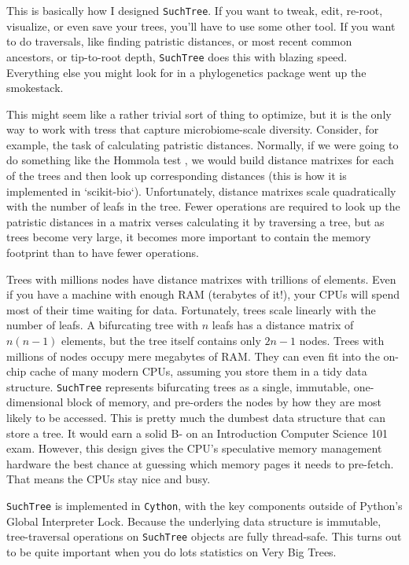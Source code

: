 \documentclass[
10pt, %
a4paper, %
oneside, %
headinclude,footinclude, %
BCOR5mm, %
]{scrartcl}
\begin{document}
This is basically how I designed {\tt SuchTree}. If you want to tweak, edit, re-root, visualize, or even save your trees, you'll have to use some other tool. If you want to do traversals, like finding patristic distances, or most recent common ancestors, or tip-to-root depth, {\tt SuchTree} does this with blazing speed. Everything else you might look for in a phylogenetics package went up the smokestack.

This might seem like a rather trivial sort of thing to optimize, but it is the only way to work with tress that capture microbiome-scale diversity. Consider, for example, the task of calculating patristic distances. Normally, if we were going to do something like the Hommola test \cite{hommola2009permutation,}, we would build distance matrixes for each of the trees and then look up corresponding distances (this is how it is implemented in `scikit-bio`). Unfortunately, distance matrixes scale quadratically with the number of leafs in the tree. Fewer operations are required to look up the patristic distances in a matrix verses calculating it by traversing a tree, but as trees become very large, it becomes more important to contain the memory footprint than to have fewer operations.

Trees with millions nodes have distance matrixes with trillions of elements. Even if you have a machine with enough RAM (terabytes of it!), your CPUs will spend most of their time waiting for data. Fortunately, trees scale linearly with the number of leafs. A bifurcating tree with $n$ leafs has a distance matrix of $n(n-1)$ elements, but the tree itself contains only $2n-1$ nodes. Trees with millions of nodes occupy mere megabytes of RAM. They can even fit into the on-chip cache of many modern CPUs, assuming you store them in a tidy data structure. {\tt SuchTree} represents bifurcating trees as a single, immutable, one-dimensional block of memory, and pre-orders the nodes by how they are most likely to be accessed. This is pretty much the dumbest data structure that can store a tree. It would earn a solid B- on an Introduction Computer Science 101 exam. However, this design gives the CPU's speculative memory management hardware the best chance at guessing which memory pages it needs to pre-fetch. That means the CPUs stay nice and busy.

{\tt SuchTree} is implemented in {\tt Cython}, with the key components outside of Python's Global Interpreter Lock. Because the underlying data structure is immutable, tree-traversal operations on {\tt SuchTree} objects are fully thread-safe. This turns out to be quite important when you do lots statistics on Very Big Trees. 
\end{document}

